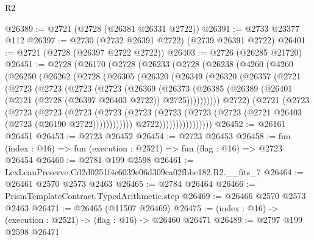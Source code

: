 \begin{lexlean}{R2}
\begin{coremodule}
@26389 := @2721 (@2728 (@26381 @26331 @2722))
@26391 := @2733 @23377 @112
@26397 := @2730 (@2732 @26391 @2722) (@2739 @26391 @2722)
@26401 := @2721 (@2728 (@26397 @2722 @2722))
@26403 := @2726 (@26285 @21720)
@26451 := @2728
    (@26170
      (@2728
        (@26233
          (@2728
            (@26238
              (@4260
                (@4260
                  (@26250
                    (@26262
                      (@2728
                        (@26305
                          (@26320
                            (@26349
                              (@26320
                                (@26357
                                  (@2721
                                    (@2723
                                      (@2723
                                        (@2723
                                          (@2723
                                            (@26369
                                              (@26373
                                                (@26385
                                                  (@26389
                                                    (@26401
                                                      (@2721
                                                        (@2728 (@26397 @26403 @2722))
                                                        @2725))))))))))
                                    @2722)
                                  (@2721
                                    (@2723
                                      (@2723
                                        (@2723
                                          (@2723
                                            (@2723
                                              (@2723
                                                (@2723
                                                  (@2723
                                                    (@2723
                                                      (@2721 @26403 (@2723 (@26190 @2722))))))))))))
                                    @2722))))))))))))))))
@26452 := @26161 @26451
@26453 := @2723 @26452
@26454 := @2723 @26453
@26458 := fun (index : @16) => fun (execution : @2521) => fun (flag : @16) => @2723 @26454
@26460 := @2781 @199 @2598
@26461 := LexLeanPreserve.Cd2d0251f4e6039e06d309ca02fbbe182.R2.__fits_7
@26464 := @26461 @2570 @2573 @2463
@26465 := @2784 @26464
@26466 := PrismTemplateContract.TypedArithmetic.step
@26469 := @26466 @2570 @2573 @2463
@26471 := @26465 (@11507 @26469)
@26475 := (index : @16) -> (execution : @2521) -> (flag : @16) -> @26460 @26471
@26489 := @2797
    @199
    @2598
    @26471

\end{coremodule}
\end{lexlean}
